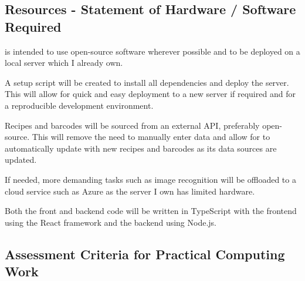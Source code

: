 \documentclass[../CHEFCookingHelper.tex]{subfiles}
\begin{document}

\subsection{Resources - Statement of Hardware / Software Required}
\label{sec:resources_statement}

\chef{} is intended to use open-source software wherever possible and to be deployed on a local server which I already own.

A setup script will be created to install all dependencies and deploy the server. This will allow for quick and easy deployment to a new server
if required and for a reproducible development environment.

Recipes and barcodes will be sourced from an external API, preferably open-source. This will remove the need to manually enter data and allow for
\chef{} to automatically update with new recipes and barcodes as its data sources are updated.

If needed, more demanding tasks such as image recognition will be offloaded to a cloud service such as Azure as the server I own has limited hardware.

Both the front and backend code will be written in TypeScript with the frontend using the React framework and the backend using Node.js.

\subsection{Assessment Criteria for Practical Computing Work}
\end{document}
